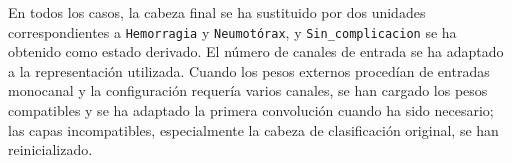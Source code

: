 En todos los casos, la cabeza final se ha sustituido por dos unidades correspondientes a \texttt{Hemorragia} y \texttt{Neumotórax}, y \texttt{Sin\_complicacion} se ha obtenido como estado derivado. El número de canales de entrada se ha adaptado a la representación utilizada. Cuando los pesos externos procedían de entradas monocanal y la configuración requería varios canales, se han cargado los pesos compatibles y se ha adaptado la primera convolución cuando ha sido necesario; las capas incompatibles, especialmente la cabeza de clasificación original, se han reinicializado.





